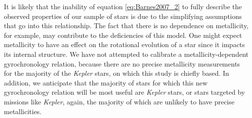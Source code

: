 It is likely that the inability of equation \ref{eq:Barnes2007_2} to fully
describe the observed properties of our sample of stars is due to the
simplifying assumptions that go into this relationship.
The fact that there is no dependence on metallicity, for example, may
contribute to the deficiencies of this model.
One might expect metallicity to have an effect on the rotational evolution of
a star since it impacts its internal structure.
We have not attempted to calibrate a metallicity-dependent gyrochronology
relation, because there are no precise metallicity measurements for the
majority of the {\it Kepler} stars, on which this study is chiefly based.
In addition, we anticipate that the majority of stars for which this new
gyrochronology relation will be most useful are {\it Kepler} stars, or stars
targeted by missions like {\it Kepler}, again, the majority of which are unlikely to
have precise metallicities.  %

